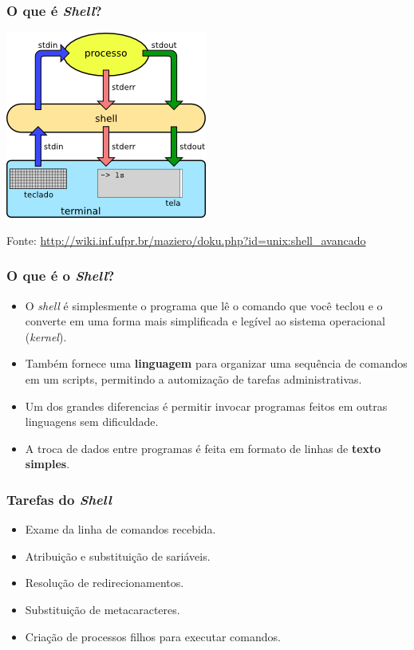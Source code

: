 \documentclass{beamer}
\begin{document}
\begin{frame}
   \frametitle{O que é \textit{Shell}?}
   \begin{center}
   \includegraphics[scale=1.0]{figuras/funcionamento_terminal.png}
   \end{center}
   \tiny
   Fonte: \url{http://wiki.inf.ufpr.br/maziero/doku.php?id=unix:shell_avancado}
\end{frame}

   \begin{frame}
      \frametitle{O que é o \textit{Shell}?}
      \begin{itemize}
         \item O \textit{shell} é simplesmente o programa que lê o comando que você teclou e o converte em uma forma mais simplificada e legível ao sistema operacional (\textit{kernel}). 
         \item Também fornece uma \textbf{linguagem} para organizar uma sequência de comandos em um scripts, permitindo a automização de tarefas administrativas. 
	 \item Um dos grandes diferencias é permitir invocar programas feitos em outras linguagens sem dificuldade.
	 \item A troca de dados entre programas é feita em formato de linhas de \textbf{texto simples}.
      \end{itemize}
   \end{frame}

   \begin{frame}
      \frametitle{Tarefas do \textit{Shell}}
      \begin{itemize}
         \item Exame da linha de comandos recebida.
         \item Atribuição e substituição de sariáveis.
         \item Resolução de redirecionamentos.
         \item Substituição de metacaracteres.
         \item Criação de processos filhos para executar comandos.
      \end{itemize}
   \end{frame}
\end{document}
